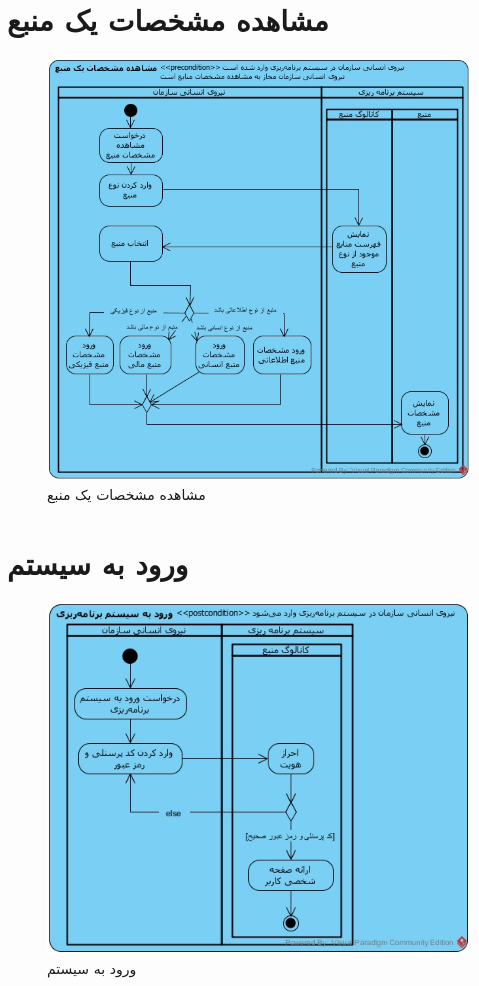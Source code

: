 \section{مشاهده مشخصات یک منبع}
\begin{figure}[H]
	\centering
	\includegraphics[scale=0.7]{img/activity/ViewResourceAttributes}
	\caption{مشاهده مشخصات یک منبع}
\end{figure}

\section{ورود به سیستم}
\begin{figure}[H]
	\centering
	\includegraphics[scale=0.8]{img/activity/SignIn}
	\caption{ورود به سیستم}
\end{figure}


